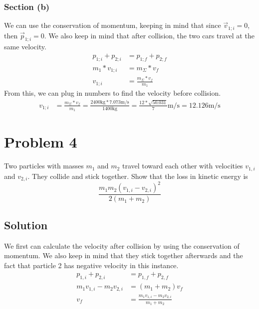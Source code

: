 \documentclass[12pt]{article}
\begin{document}
\subsubsection*{Section (b)}
We can use the conservation of momentum, keeping in mind that since $\vec{v}_{1;i} = 0$, then \(\vec{p}_{1;i} = 0\). We also keep in mind that after collision, the two cars travel at the same velocity.
\begin{align*}
    p_{1;i} + p_{2;i} &= p_{1;f} + p_{2;f}\\
    m_1*v_{1;i} &=  m_\Sigma * v_f\\
    v_{1;i} &=  \frac{m_\Sigma * v_f}{m_1}
\end{align*}
From this, we can plug in numbers to find the velocity before collision.
\begin{align*}
    v_{1;i} &=  \frac{m_\Sigma * v_f}{m_1}
        =   \frac{2400\unit{\kilo\gram} * 7.073\unit{\meter/\second}}{1400\unit{\kilo\gram}}
        =   \boxed{\frac{12*\sqrt{50.031}}{7}\unit{\meter/\second} 
        =   12.126\unit{\meter/\second}}
\end{align*}


\pagebreak
\section*{Problem 4}
Two particles with masses $m_1$ and $m_2$ travel toward each other with velocities $v_{1,i}$ and $v_{2,i}$. They collide and stick together. Show that the loss in kinetic energy is
\[ \frac{m_1 m_2 \left(v_{1,i} - v_{2,i}\right)^2}{2(m_1 + m_2)} \]

\subsection*{Solution}
We first can calculate the velocity after collision by using the conservation of momentum. We also keep in mind that they stick together afterwards and the fact that particle 2 has negative velocity in this instance.
\begin{align*}
    p_{1,i} + p_{2,i} &=  p_{1,f} + p_{2,f}\\
    m_1 v_{1,i} - m_2 v_{2,i} &=  (m_1 + m_2) v_f\\
    v_f &=  \frac{m_1 v_{1,i} - m_2 v_{2,i}}{m_1 + m_2}
\end{align*}
\end{document}
